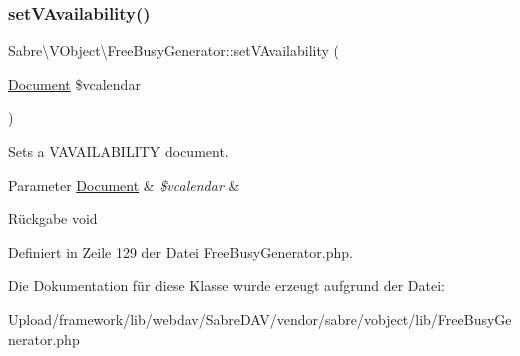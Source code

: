 \subsubsection{\texorpdfstring{set\+V\+Availability()}{setVAvailability()}}
{\footnotesize\ttfamily Sabre\textbackslash{}\+V\+Object\textbackslash{}\+Free\+Busy\+Generator\+::set\+V\+Availability (\begin{DoxyParamCaption}\item[{\mbox{\hyperlink{class_sabre_1_1_v_object_1_1_document}{Document}}}]{\$vcalendar }\end{DoxyParamCaption})}

Sets a V\+A\+V\+A\+I\+L\+A\+B\+I\+L\+I\+TY document.


\begin{DoxyParams}[1]{Parameter}
\mbox{\hyperlink{class_sabre_1_1_v_object_1_1_document}{Document}} & {\em \$vcalendar} & \\
\hline
\end{DoxyParams}
\begin{DoxyReturn}{Rückgabe}
void 
\end{DoxyReturn}


Definiert in Zeile 129 der Datei Free\+Busy\+Generator.\+php.



Die Dokumentation für diese Klasse wurde erzeugt aufgrund der Datei\+:\begin{DoxyCompactItemize}
\item 
Upload/framework/lib/webdav/\+Sabre\+D\+A\+V/vendor/sabre/vobject/lib/Free\+Busy\+Generator.\+php\end{DoxyCompactItemize}
